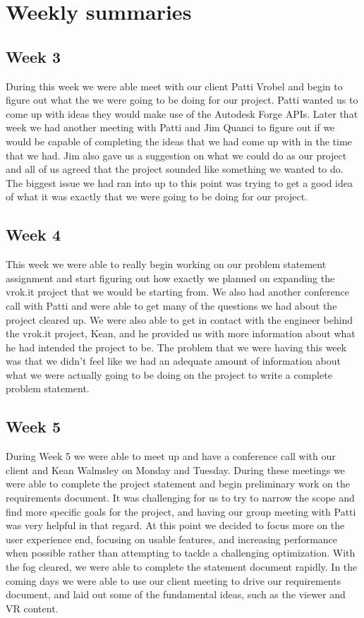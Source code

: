 \documentclass[10pt,draftclsnofoot,onecolumn]{IEEEtran}
\begin{document}
\newpage

\section{Weekly summaries}
\subsection{Week 3}
During this week we were able meet with our client Patti Vrobel and begin to figure out what the we were going to be doing for our project. Patti wanted us to come up with ideas they would make use of the Autodesk Forge APIs. Later that week we had another meeting with Patti and Jim Quanci to figure out if we would be capable of completing the ideas that we had come up with in the time that we had. Jim also gave us a suggestion on what we could do as our project and all of us agreed that the project sounded like something we wanted to do. The biggest issue we had ran into up to this point was trying to get a good idea of what it was exactly that we were going to be doing for our project.   

\subsection{Week 4}
This week we were able to really begin working on our problem statement assignment and start figuring out how exactly we planned on expanding the vrok.it project that we would be starting from. We also had another conference call with Patti and were able to get many of the questions we had about the project cleared up. We were also able to get in contact with the engineer behind the vrok.it project, Kean, and he provided us with more information about what he had intended the project to be. The problem that we were having this week was that we didn't feel like we had an adequate amount of information about what we were actually going to be doing on the project to write a complete problem statement. 

\subsection{Week 5}
During Week 5 we were able to meet up and have a conference call with our client and Kean Walmsley on Monday and Tuesday. During these meetings we were able to complete the project statement and begin preliminary work on the requirements document. It was challenging for us to try to narrow the scope and find more specific goals for the project, and having our group meeting with Patti was very helpful in that regard. At this point we decided to focus more on the user experience end, focusing on usable features, and increasing performance when possible rather than attempting to tackle a challenging optimization. With the fog cleared, we were able to complete the statement document rapidly. In the coming days we were able to use our client meeting to drive our requirements document, and laid out some of the fundamental ideas, such as the viewer and VR content.
\end{document}
